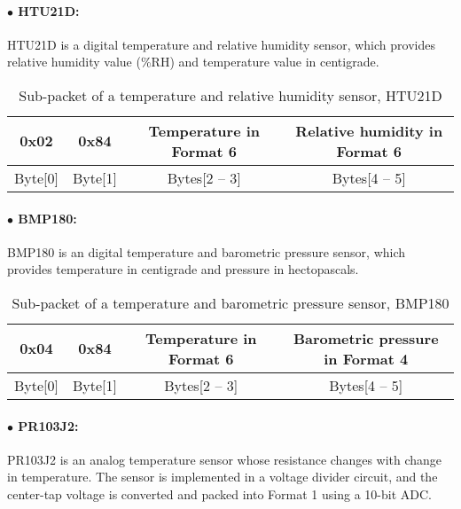 \paragraph{$\bullet$ HTU21D:}
HTU21D is a digital temperature and relative humidity sensor, which provides
relative humidity value (\%RH) and temperature value in centigrade.

\begin{table}[h!]
    \centering
    \caption{Sub-packet of a temperature and relative humidity sensor, HTU21D}
    \begin{tabular}{|c|c|c|c|}
        \hline
        \rowcolor{black!8}
        \textbf{0x02} & \textbf{0x84} & \textbf{Temperature in Format 6} & \textbf{Relative humidity in Format 6}\\
        \hline
        Byte[0] & Byte[1] & Bytes[2 -- 3] & Bytes[4 -- 5] \\ \hline
    \end{tabular}
\end{table}


\paragraph{$\bullet$ BMP180:}

BMP180 is an digital temperature and barometric pressure sensor,
which provides temperature in centigrade and pressure in hectopascals.


\begin{table}[h!]
    \centering
    \caption{Sub-packet of a temperature and barometric pressure sensor, BMP180}
    \begin{tabular}{|c|c|c|c|}
        \hline
        \rowcolor{black!8}
        \textbf{0x04} & \textbf{0x84} & \textbf{Temperature in Format 6} & \textbf{Barometric pressure in Format 4}\\
        \hline
        Byte[0] & Byte[1] & Bytes[2 -- 3] & Bytes[4 -- 5] \\ \hline
    \end{tabular}
\end{table}


\paragraph{$\bullet$ PR103J2:}

PR103J2 is an analog temperature sensor whose resistance changes with change in temperature.
The sensor is implemented in a voltage divider circuit, and the center-tap voltage is converted and packed into Format 1 using a 10-bit ADC.



